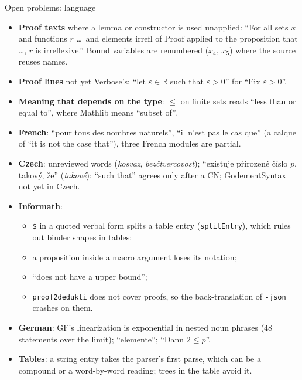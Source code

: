 \documentclass[10pt,aspectratio=169]{beamer}
\newcommand{\bad}[1]{\textcolor{warn}{#1}}
\begin{document}
\begin{frame}{Open problems: language}
  \scriptsize
  \begin{itemize}
    \item \textbf{Proof texts} where a lemma or constructor is used unapplied:
          ``For all sets $x$ and functions $r$ \ldots\ and elements
          $\mathrm{irrefl}$ of $\mathrm{Proof}$ applied to the proposition
          that \ldots, $r$ is irreflexive.'' Bound variables are renumbered
          ($x_4$, $x_5$) where the source reuses names.
    \item \textbf{Proof lines} not yet Verbose's: ``let $\varepsilon \in \mathbb{R}$ such that
          $\varepsilon > 0$'' for ``Fix $\varepsilon > 0$''.
    \item \textbf{Meaning that depends on the type}: $\leq$ on finite sets reads
          ``less than or equal to'', where Mathlib means ``subset of''.
    \item \textbf{French}: ``pour tous \bad{des} nombres naturels'', ``il
          n'est pas le cas que'' (a calque of ``it is not the case that''),
          three French modules are partial.
    \item \textbf{Czech}: unreviewed words (\emph{kosvaz}, \emph{bezčtvercovost}); ``existuje
          přirozené číslo $p$, \bad{takový}, že'' (\emph{takové}): ``such that'' agrees only
          after a CN; GodementSyntax not yet in Czech.
    \item \textbf{Informath}:
      \begin{itemize}
        \item \texttt{\$} in a quoted verbal form splits a table entry
              (\texttt{splitEntry}), which rules out binder shapes in tables;
        \item a proposition inside a macro argument loses its notation;
        \item ``does not have \bad{a} upper bound'';
        \item \texttt{proof2dedukti} does not cover proofs, so the
              back-translation of \texttt{-json} crashes on them.
      \end{itemize}
    \item \textbf{German}: GF's linearization is exponential in nested noun phrases
          (48 statements over the limit); ``elemente''; ``Dann $2 \leq p$''.
    \item \textbf{Tables}: a string entry takes the parser's first parse, which can be a
          compound or a word-by-word reading; trees in the table avoid it.
  \end{itemize}
\end{frame}
\end{document}
